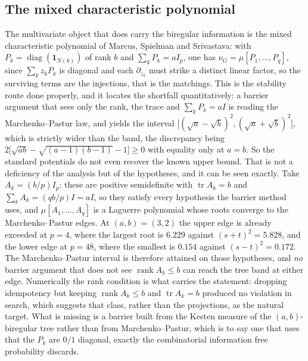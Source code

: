 \documentclass[11pt]{article}
\theoremstyle{remark}
\begin{document}
\subsection{The mixed characteristic polynomial}

The multivariate object that does carry the biregular information is the mixed
characteristic polynomial of Marcus, Spielman and Srivastava: with
$P_k=\operatorname{diag}(\mathbf 1_{N(k)})$ of rank $b$ and $\sum_kP_k=aI_p$, one
has $\nu_G=\mu[P_1,\dots,P_q]$, since $\sum_kz_kP_k$ is diagonal and each
$\partial_{z_k}$ must strike a distinct linear factor, so the surviving terms are
the injections, that is the matchings. This is the stability route done properly,
and it locates the shortfall quantitatively: a barrier argument that sees only
the rank, the trace and $\sum_kP_k=aI$ is reading the Marchenko--Pastur law, and
yields the interval $\bigl[(\sqrt a-\sqrt b)^2,(\sqrt a+\sqrt b)^2\bigr]$, which
is strictly wider than the band, the discrepancy being
$2\bigl[\sqrt{ab}-\sqrt{(a-1)(b-1)}-1\bigr]\ge0$ with equality only at $a=b$. So
the standard potentials do not even recover the known upper bound. That is not a
deficiency of the analysis but of the hypotheses, and it can be seen exactly. Take
$A_k=(b/p)I_p$: these are positive semidefinite with
$\operatorname{tr}A_k=b$ and $\sum_kA_k=(qb/p)I=aI$, so they satisfy every
hypothesis the barrier method uses, and $\mu[A_1,\dots,A_q]$ is a Laguerre
polynomial whose roots converge to the Marchenko--Pastur edges. At $(a,b)=(3,2)$ the
upper edge is already exceeded at $p=4$, where the largest root is $6.229$ against
$(s+t)^2=5.828$, and the lower edge at $p=48$, where the smallest is $0.154$
against $(s-t)^2=0.172$. The Marchenko--Pastur interval is therefore attained on
those hypotheses, and \emph{no} barrier argument that does not see
$\operatorname{rank}A_k\le b$ can reach the tree band at either edge. Numerically
the rank condition is what carries the statement: dropping idempotency but keeping
$\operatorname{rank}A_k\le b$ and $\operatorname{tr}A_k=b$ produced no violation in
search, which suggests that class, rather than the projections, as the natural
target. What is
missing is a barrier built from the Kesten measure of the $(a,b)$-biregular tree
rather than from Marchenko--Pastur, which is to say one that uses that the $P_k$
are $0/1$ diagonal, exactly the combinatorial information free probability
discards.
\end{document}
